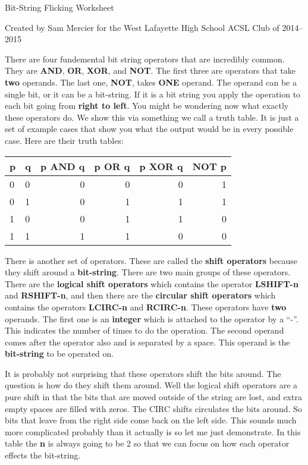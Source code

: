 \documentclass[12pt,letterpaper]{article}
\begin{document}
\begin{center}
  Bit-String Flicking Worksheet

  Created by Sam Mercier for the West Lafayette High School ACSL Club of 2014--2015
\end{center}

There are four fundemental bit string operators that are incredibly common. They are \textbf{AND}, \textbf{OR}, \textbf{XOR}, and \textbf{NOT}. The first three are operators that take \textbf{two} operands. The last one, \textbf{NOT}, takes \textbf{ONE} operand. The operand can be a single bit, or it can be a bit-string. If it is a bit string you apply the operation to each bit going from \textbf{right to left}. You might be wondering now what exactly these operators do. We show this via something we call a truth table. It is just a set of example cases that show you what the output would be in every possible case. Here are their truth tables:

\begin{center}
  \begin{tabular}{ l | l || r | r | r | r}
    \hline
    p & q & p \textbf{AND} q & p \textbf{OR} q & p \textbf{XOR} q & \textbf{NOT} p \\
    \hline \hline
    0 & 0 & 0 & 0 & 0 & 1 \\
    0 & 1 & 0 & 1 & 1 & 1 \\
    1 & 0 & 0 & 1 & 1 & 0 \\
    1 & 1 & 1 & 1 & 0 & 0 \\
    \hline
  \end{tabular}
\end{center}

There is another set of operators. These are called the \textbf{shift operators} because they shift around a \textbf{bit-string}. There are two main groups of these operators. There are the \textbf{logical shift operators} which contains the operator \textbf{LSHIFT-n} and \textbf{RSHIFT-n}, and then there are the \textbf{circular shift operators} which contains the operators \textbf{LCIRC-n} and \textbf{RCIRC-n}. These operators have \textbf{two} operands. The first one is an \textbf{integer} which is attached to the operator by a ``-''. This indicates the number of times to do the operation. The second operand comes after the operator also and is separated by a space. This operand is the \textbf{bit-string} to be operated on.

It is probably not surprising that these operators shift the bits around. The question is how do they shift them around. Well the logical shift operators are a pure shift in that the bits that are moved outside of the string are lost, and extra empty spaces are filled with zeros. The CIRC shifts circulates the bits around. So bits that leave from the right side come back on the left side. This sounds much more complicated probably than it actually is so let me just demonstrate. In this table the \textbf{n} is always going to be 2 so that we can focus on how each operator effects the bit-string.
\end{document}
